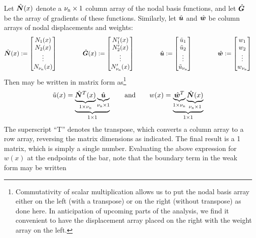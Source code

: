 \renewcommand{\gradNBFa}{\Array{G}}
Let $\hat{\bm{N}}(x)$ denote a 
${\nu_\text{n}}\times1$ column array of the nodal basis functions, and let $\gradNBFa$ be the array of gradients of these functions. Similarly, 
let $\hat{\bm{u}}$ and $\hat{\bm{w}}$ be \numnodes{} column arrays of nodal displacements and weights:
\begin{equation}
  \NBFa(x)\definedEqual\begin{bmatrix}\NBF_1(x)\\ \NBF_2(x) \\ \vdots \\ \NBF_\numnodes(x)\end{bmatrix}
\qquad\qquad
  \gradNBFa(x)\definedEqual\begin{bmatrix}\NBF_1'(x)\\ \NBF_2'(x) \\ \vdots \\ \NBF_\numnodes'(x)\end{bmatrix}
\qquad\qquad
  \Array{u}\definedEqual\begin{bmatrix} \aprx{u}_1\\ \aprx{u}_2 \\ \vdots \\ \aprx{u}_\numnodes\end{bmatrix}
\qquad\qquad
  \Array{w}\definedEqual\begin{bmatrix}w_1\\ w_2 \\ \vdots \\ w_\numnodes\end{bmatrix}
\end{equation}
Then  may be written in matrix form as\footnote{Commutativity of scalar multiplication allows us to put the nodal basis array either on the left (with a transpose) or on the right (without transpose) as done here. In anticipation of upcoming parts of the analysis, we find it convenient to have the displacement array placed on the right with the weight array on the left.}
\begin{equation}
\tilde{u}(x)=\underbrace{
\underbrace{\hat{\bm{N}}^T(x)}_{1\times{\nu_\text{n}}} \underbrace{\hat{\bm{u}}}_{{\nu_\text{n}}\times1}}_{1\times1}
\qquad\text{and}\qquad
 w(x)=\underbrace{\underbrace{\hat{\bm{w}}^T}_{1\times{\nu_\text{n}}}\underbrace{\hat{\bm{N}}(x)}_{{\nu_\text{n}}\times1}}_{1\times1}
\label{eq:uandwstatic}
\end{equation}
The superscript ``T'' denotes the transpose, which converts a column array to a row array, reversing the matrix dimensions as indicated.  The final result is a 1 matrix, which is simply a single number.  Evaluating the above expression for $w(x)$ at the endpoints of the bar, note that the boundary term in the weak form may be written
